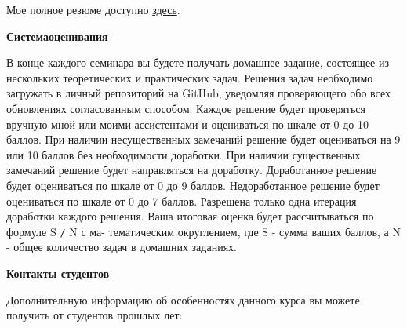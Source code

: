 \documentclass[a4paper,12pt]{article}
\begin{document}
\medskip

Мое полное резюме доступно \href{https://drive.google.com/file/d/1dUaQrpZvgF2BVF1bo0Kxokab4DkqiqXu/view?usp=sharing}{здесь}.

\bigskip

\textbf{Система\:оценивания}

\medskip

В конце каждого семинара вы будете получать домашнее задание, состоящее из нескольких теоретических и практических задач. Решения задач необходимо загружать в личный репозиторий на GitHub, уведомляя проверяющего обо всех обновлениях согласованным способом. Каждое решение будет проверяться вручную мной или моими ассистентами и оцениваться по шкале от 0 до 10 баллов. При наличии несущественных замечаний решение будет оцениваться на 9 или 10 баллов без необходимости доработки. При наличии существенных замечаний решение будет направляться на доработку. Доработанное решение будет оцениваться по шкале от 0 до 9 баллов. Недоработанное решение будет оцениваться по шкале от 0 до 7 баллов. Разрешена только одна итерация доработки каждого решения. Ваша итоговая оценка будет рассчитываться по формуле S \texttt{/} N с ма- тематическим округлением, где S - сумма ваших баллов, а N - общее количество задач в домашних заданиях.

\bigskip

\textbf{Контакты студентов}

\medskip

Дополнительную информацию об особенностях данного курса вы можете получить от студентов прошлых лет:

\medskip
\end{document}
